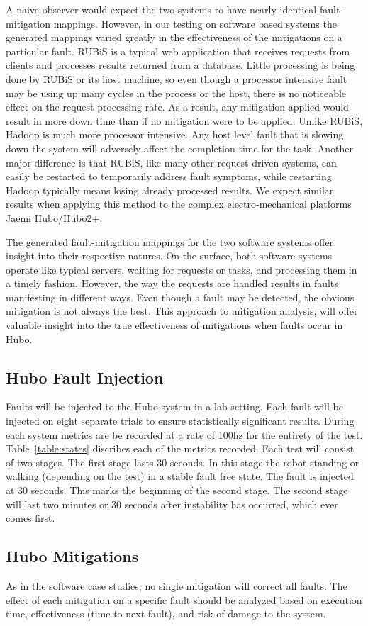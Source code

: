 A naive observer would expect the two systems to have nearly identical fault-mitigation mappings. However, in our testing on software based systems the generated mappings varied greatly in the effectiveness of the mitigations on a particular fault.  RUBiS is a typical web application that receives requests from clients and processes results returned from a database. Little processing is being done by RUBiS or its host machine, so even though a processor intensive fault may be using up many cycles in the process or the host, there is no noticeable effect on the request processing rate. As a result, any mitigation applied would result in more down time than if no mitigation were to be applied. Unlike RUBiS, Hadoop is much more processor intensive. Any host level fault that is slowing down the system will adversely affect the completion time for the task. Another major difference is that RUBiS, like many other request driven systems, can easily be restarted to temporarily address fault symptoms, while restarting Hadoop typically means losing already processed results.  We expect similar results when applying this method to the complex electro-mechanical platforms Jaemi Hubo/Hubo2+.

The generated fault-mitigation mappings for the two software systems offer insight into their respective natures. On the surface, both software systems operate like typical servers, waiting for requests or tasks, and processing them in a timely fashion. However, the way the requests are handled results in faults manifesting in different ways. Even though a fault may be detected, the obvious mitigation is not always the best. This approach to mitigation analysis, will offer valuable insight into the true effectiveness of mitigations when faults occur in Hubo.

\subsection{Hubo Fault Injection}
Faults will be injected to the Hubo system in a lab setting.  Each fault will be injected on eight separate trials to ensure statistically significant results.  During each system metrics are be recorded at a rate of 100hz for the entirety of the test.  Table~\ref{table:states} discribes each of the metrics recorded.  Each test will consist of two stages.  The first stage lasts 30 seconds.  In this stage the robot standing or walking (depending on the test) in a stable fault free state.  The fault is injected at 30 seconds.  This marks the beginning of the second stage.  The second stage will last two minutes or 30 seconds after instability has occurred, which ever comes first.

\subsection{Hubo Mitigations}
As in the software case studies, no single mitigation will correct all faults. The effect of each mitigation on a specific fault should be analyzed based on execution time, effectiveness (time to next fault), and risk of damage to the system.







